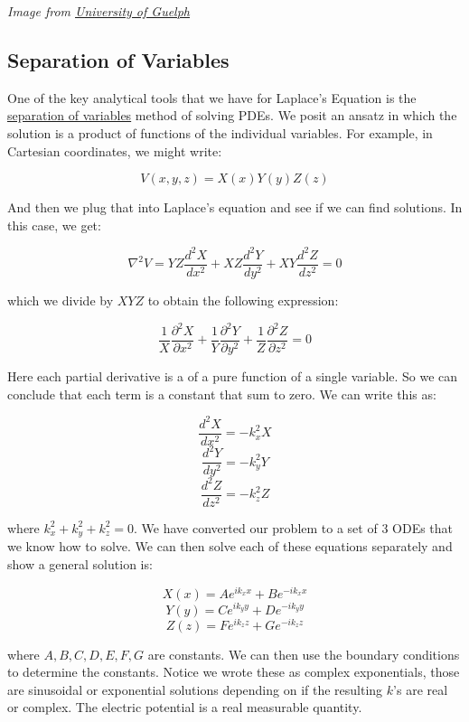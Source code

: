 \emph{Image from
\href{https://www.physics.uoguelph.ca/chapter-10-laplaces-equation}{University
of Guelph}}

\subsection{Separation of Variables}\label{separation-of-variables}

One of the key analytical tools that we have for Laplace's Equation is
the
\href{https://en.wikipedia.org/wiki/Separation_of_variables}{separation
of variables} method of solving PDEs. We posit an ansatz in which the
solution is a product of functions of the individual variables. For
example, in Cartesian coordinates, we might write:

\[V(x,y,z) = X(x)Y(y)Z(z)\]

And then we plug that into Laplace's equation and see if we can find
solutions. In this case, we get:

\[\nabla^2 V = YZ\frac{d^2 X}{dx^2} + XZ\frac{d^2 Y}{dy^2} + XY\frac{d^2 Z}{dz^2} = 0\]

which we divide by \(XYZ\) to obtain the following expression:

\[\frac{1}{X}\frac{\partial^2 X}{\partial x^2} + \frac{1}{Y}\frac{\partial^2 Y}{\partial y^2} + \frac{1}{Z}\frac{\partial^2 Z}{\partial z^2} = 0\]

Here each partial derivative is a of a pure function of a single
variable. So we can conclude that each term is a constant that sum to
zero. We can write this as:

\[\frac{d^2 X}{d x^2} = -k_x^2X\] \[\frac{d^2 Y}{d y^2} = -k_y^2Y\]
\[\frac{d^2 Z}{d z^2} = -k_z^2Z\]

where \(k_x^2 + k_y^2 + k_z^2 = 0\). We have converted our problem to a
set of 3 ODEs that we know how to solve. We can then solve each of these
equations separately and show a general solution is:

\[X(x) = Ae^{ik_xx} + Be^{-ik_xx}\] \[Y(y) = Ce^{ik_yy} + De^{-ik_yy}\]
\[Z(z) = Fe^{ik_zz} + Ge^{-ik_zz}\]

where \(A,B,C,D,E,F,G\) are constants. We can then use the boundary
conditions to determine the constants. Notice we wrote these as complex
exponentials, those are sinusoidal or exponential solutions depending on
if the resulting \(k\)'s are real or complex. The electric potential is
a real measurable quantity.

